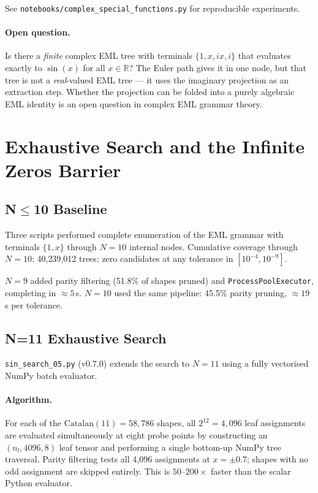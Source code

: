 \documentclass[11pt,a4paper]{article}
\begin{document}
See \texttt{notebooks/complex\_special\_functions.py} for reproducible experiments.

\paragraph{Open question.}
Is there a \emph{finite} complex EML tree with terminals $\{1, x, ix, i\}$
that evaluates exactly to $\sin(x)$ for all $x\in\mathbb{R}$?  The Euler
path gives it in one node, but that tree is not a \emph{real}-valued EML
tree — it uses the imaginary projection as an extraction step.  Whether the
projection can be folded into a purely algebraic EML identity
is an open question in complex EML grammar theory.

\section{Exhaustive Search and the Infinite Zeros Barrier}
\label{sec:zeros}

\subsection{N$\leq$10 Baseline}

Three scripts performed complete enumeration of the EML grammar with
terminals $\{1,x\}$ through $N=10$ internal nodes.  Cumulative
coverage through $N=10$: 40{,}239{,}012 trees; zero candidates at
any tolerance in $[10^{-4},10^{-9}]$.

$N=9$ added parity filtering (51.8\% of shapes pruned) and
\texttt{ProcessPoolExecutor}, completing in $\approx5$\,s.
$N=10$ used the same pipeline: 45.5\% parity pruning,
$\approx19$\,s per tolerance.

\subsection{N=11 Exhaustive Search}
\label{sec:n11}

\texttt{sin\_search\_05.py} (v0.7.0) extends the search to $N=11$
using a fully vectorised NumPy batch evaluator.

\paragraph{Algorithm.}
For each of the $\mathrm{Catalan}(11)=58{,}786$ shapes, all
$2^{12}=4{,}096$ leaf assignments are evaluated simultaneously at
eight probe points by constructing an $(n_l, 4096, 8)$ leaf tensor
and performing a single bottom-up NumPy tree traversal.
Parity filtering tests all 4{,}096 assignments at $x=\pm0.7$;
shapes with no odd assignment are skipped entirely.
This is $50$--$200\times$ faster than the scalar Python evaluator.
\end{document}
